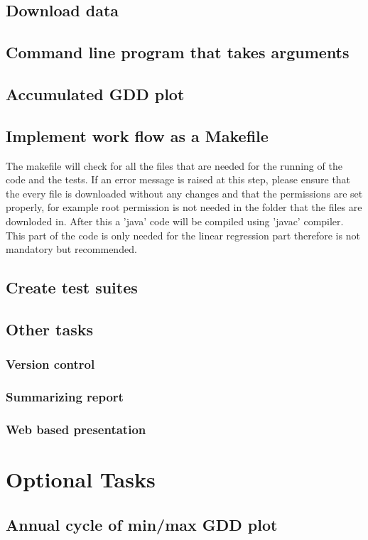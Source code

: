 \documentclass[11pt,letterpaper]{article}
\begin{document}
\subsection{Download data}
\subsection{Command line program that takes arguments}
\subsection{Accumulated GDD plot}
\subsection{Implement work flow as a Makefile}
The makefile will check for all the files that are needed for the running of the code and the tests. If an error message is raised at this step, please ensure that the every file is downloaded without any changes and that the permissions are set properly, for example root permission is not needed in the folder that the files are downloded in. 
After this a 'java' code will be compiled using 'javac' compiler. This part of the code is only needed for the linear regression part therefore is not mandatory but recommended.
\subsection{Create test suites}
\subsection{Other tasks}
\subsubsection{Version control}
\subsubsection{Summarizing report} 
\subsubsection{Web based presentation}

\section{Optional Tasks}
\subsection{Annual cycle of min/max GDD  plot}
\end{document}
